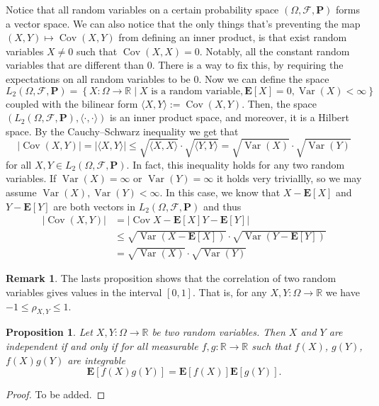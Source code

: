 \documentclass[11pt,a4paper]{article}
\theoremstyle{definition}
\newtheorem{remark}{Remark}[section]
\theoremstyle{plain}
\newtheorem{proposition}[theorem]{Proposition}
\DeclareMathOperator{\Var}{Var}
\DeclareMathOperator{\Cov}{Cov}
\newcommand{\R}{\mathbb{R}}
\newcommand{\E}{\mathbf{E}}
\newcommand{\Prob}{\mathbf{P}}
\newcommand{\ip}[2]{\langle #1, #2 \rangle}
\newcommand{\set}[2]{ \left\{ #1 \mid #2 \right\} }
\newcommand{\abs}[1]{\left\lvert #1\right\rvert}
\begin{document}
  Notice that all random variables on a certain probability space
  $(\Omega, \mathcal F, \Prob)$ forms a vector space. We can also
  notice that the only things that's preventing the map 
  $(X,Y) \mapsto \Cov(X,Y)$ from defining an inner product, is that
  exist random variables $X \neq 0$ such that $\Cov(X,X) = 0$.
  Notably, all the constant random variables that are different than
  $0$. There is a way to fix this, by requiring the expectations on
  all random variables to be $0$. Now we can define the space
  \[
    L_2(\Omega, \mathcal F, \Prob) =
    \set{X \colon \Omega \to \R}
    {X\text{ is a random variable}, \E[X] = 0, \Var(X) < \infty}
  \]
  coupled with the bilinear form $\ip{X}{Y} := \Cov(X,Y)$.
  Then, the space 
  $\left(L_2(\Omega, \mathcal F, \Prob), \ip{\cdot}{\cdot}\right)$
  is an inner product space, and moreover, it is a Hilbert space.
  By the Cauchy--Schwarz inequality we get that
  \[
    \abs{\Cov(X,Y)} =
    \abs{\ip{X}{Y}} \le
    \sqrt{\ip{X}{X}} \cdot \sqrt{\ip{Y}{Y}} =
    \sqrt{\Var(X)} \cdot \sqrt{\Var(Y)}
  \]
  for all $X,Y \in L_2(\Omega, \mathcal F, \Prob)$.
  In fact, this inequality holds for any two random variables.
  If $\Var(X) = \infty$ or $\Var(Y) = \infty$ it holds very triviallly,
  so we may assume $\Var(X),\Var(Y) < \infty$.
  In this case, we know that $X - \E[X]$ and $Y - \E[Y]$ are both
  vectors in $L_2(\Omega, \mathcal F, \Prob)$ and thus
  \begin{align*}
    \abs{\Cov(X,Y)} &= \abs{\Cov{X - \E[X]}{Y - \E[Y]}} \\
    &\le \sqrt{\Var(X - \E[X])} \cdot \sqrt{\Var(Y - \E[Y])} \\
    &= \sqrt{\Var(X)} \cdot \sqrt{\Var(Y)}
  \end{align*}

  \begin{remark}
    The lasts proposition shows that the correlation of two random variables
    gives values in the interval $[0,1]$. 
    That is, for any $X,Y \colon \Omega \to \R$ we have 
    $-1 \le \rho_{X,Y} \le 1$.
  \end{remark}
  
  \begin{proposition}
    Let $X,Y \colon \Omega \to \R$ be two random variables.
    Then $X$ and $Y$ are independent if and only if for all measurable
    $f,g \colon \R \to \R$ such that $f(X)$, $g(Y)$, $f(X)g(Y)$ are
    integrable
    \[
      \E[f(X)g(Y)] = \E[f(X)] \E[g(Y)].
    \]
  \end{proposition}
  \begin{proof}
    To be added.
  \end{proof}
  
\end{document}
